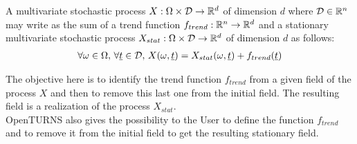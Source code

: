 \renewcommand{\filename}{docUC_StocProc_TrendComputation.tex}
\renewcommand{\filetitle}{UC : Trend computation}

\HeaderIIILevel

\label{TrendComputation}



A multivariate stochastic  process $X: \Omega \times{\mathcal D} \rightarrow {\mathbb R}^d$ of dimension $d$ where ${\mathcal D} \in {\mathbb R}^n$ may write as the sum of a trend function $f_{trend}: {\mathbb R}^n \rightarrow {\mathbb R}^d$ and a stationary multivariate stochastic process $X_{stat}: \Omega \times{\mathcal D} \rightarrow {\mathbb R}^d$ of dimension $d$ as follows:
\begin{eqnarray}
  \label{tsDecomposition}
  \forall \omega \in \Omega, \, \forall {\underline{t}} \in {\mathcal D}, \,X(\omega,{\underline{t}}) = X_{stat}(\omega,{\underline{t}}) + f_{trend}({\underline{t}})
\end{eqnarray}

The objective here is to identify the trend function $f_{trend}$ from a given field of the process $X$ and then to remove this last one from the initial field. The resulting field is a realization of the process $X_{stat}$.\\
OpenTURNS also gives the possibility to the User to define the function $f_{trend}$ and to remove it from the initial field to get the resulting stationary field.\\


